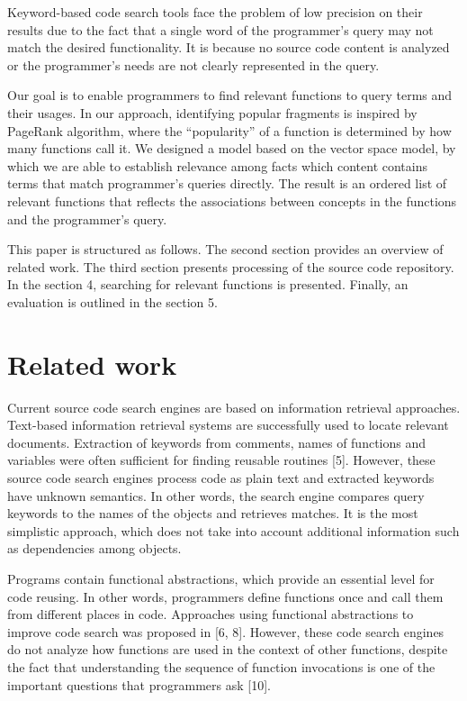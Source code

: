 \documentclass{llncs}
\begin{document}
Keyword-based code search tools face the problem of low precision on their results
due to the fact that a single word of the programmer’s query may not match the desired
functionality. It is because no source code content is analyzed or the programmer’s
needs are not clearly represented in the query.

Our goal is to enable programmers to find relevant functions to query terms and
their usages. In our approach, identifying popular fragments is inspired by PageRank
algorithm, where the “popularity” of a function is determined by how many functions
call it. We designed a model based on the vector space model, by which we are able
to establish relevance among facts which content contains terms that match programmer’s
queries directly. The result is an ordered list of relevant functions that reflects
the associations between concepts in the functions and the programmer’s query.

This paper is structured as follows. The second section provides an overview of related
work. The third section presents processing of the source code repository. In the
section 4, searching for relevant functions is presented. Finally, an evaluation is outlined
in the section 5. 
\section{Related work}

Current source code search engines are based on information retrieval approaches.
Text-based information retrieval systems are successfully used to locate relevant documents.
Extraction of keywords from comments, names of functions and variables
were often sufficient for finding reusable routines [5]. However, these source code
search engines process code as plain text and extracted keywords have unknown semantics.
In other words, the search engine compares query keywords to the names of
the objects and retrieves matches. It is the most simplistic approach, which does not
take into account additional information such as dependencies among objects.

Programs contain functional abstractions, which provide an essential level for code
reusing. In other words, programmers define functions once and call them from different
places in code. Approaches using functional abstractions to improve code
search was proposed in [6, 8]. However, these code search engines do not analyze
how functions are used in the context of other functions, despite the fact that understanding
the sequence of function invocations is one of the important questions that
programmers ask [10].
\end{document}
